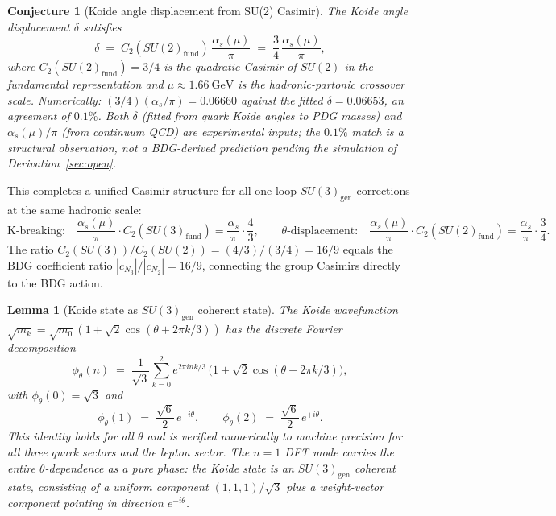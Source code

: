 \documentclass[11pt,a4paper]{article}
\newtheorem{lemma}[theorem]{Lemma}
\newtheorem{conjecture}[theorem]{Conjecture}
\begin{document}
\begin{conjecture}[Koide angle displacement from SU(2) Casimir]
\label{prop:delta_casimir}
The Koide angle displacement $\delta$ satisfies
\begin{equation}
  \delta \;=\; C_2\!\left(SU(2)_{\mathrm{fund}}\right)\,\frac{\alpha_s(\mu)}{\pi}
  \;=\; \frac{3}{4}\,\frac{\alpha_s(\mu)}{\pi},
  \label{eq:delta_casimir}
\end{equation}
where $C_2(SU(2)_{\mathrm{fund}}) = 3/4$ is the quadratic Casimir of $SU(2)$
in the fundamental representation and $\mu \approx 1.66~\mathrm{GeV}$
is the hadronic-partonic crossover scale.
Numerically: $(3/4)(\alpha_s/\pi) = 0.06660$ against the fitted
$\delta = 0.06653$, an agreement of $0.1\%$.
Both $\delta$ (fitted from quark Koide angles to PDG masses)
and $\alpha_s(\mu)/\pi$ (from continuum QCD) are experimental
inputs; the $0.1\%$ match is a structural observation, not a
BDG-derived prediction pending the simulation of Derivation~\ref{sec:open}.
\end{conjecture}

This completes a unified Casimir structure for all one-loop
$SU(3)_{\mathrm{gen}}$ corrections at the same hadronic scale:
\begin{equation}
  \text{K-breaking:}\quad
  \frac{\alpha_s(\mu)}{\pi}\cdot C_2\!\left(SU(3)_{\mathrm{fund}}\right)
  = \frac{\alpha_s}{\pi}\cdot\frac{4}{3},
  \qquad
  \text{$\theta$-displacement:}\quad
  \frac{\alpha_s(\mu)}{\pi}\cdot C_2\!\left(SU(2)_{\mathrm{fund}}\right)
  = \frac{\alpha_s}{\pi}\cdot\frac{3}{4}.
  \label{eq:casimir_pattern}
\end{equation}
The ratio $C_2(SU(3))/C_2(SU(2)) = (4/3)/(3/4) = 16/9$
equals the BDG coefficient ratio $|c_{N_3}|/|c_{N_2}| = 16/9$,
connecting the group Casimirs directly to the BDG action.

\begin{lemma}[Koide state as $SU(3)_{\mathrm{gen}}$ coherent state]
\label{lem:coherent}
The Koide wavefunction $\sqrt{m_k} = \sqrt{m_0}(1 + \sqrt{2}\cos(\theta
+ 2\pi k/3))$ has the discrete Fourier decomposition
\begin{equation}
  \phi_\theta(n) \;=\; \frac{1}{\sqrt{3}}\sum_{k=0}^2
  e^{2\pi ink/3}\,\bigl(1 + \sqrt{2}\cos(\theta+2\pi k/3)\bigr),
  \label{eq:koide_dft}
\end{equation}
with $\phi_\theta(0) = \sqrt{3}$ and
\begin{equation}
  \phi_\theta(1) \;=\; \frac{\sqrt{6}}{2}\,e^{-i\theta}, \qquad
  \phi_\theta(2) \;=\; \frac{\sqrt{6}}{2}\,e^{+i\theta}.
  \label{eq:koide_coherent}
\end{equation}
This identity holds for all $\theta$ and is verified numerically to
machine precision for all three quark sectors and the lepton sector.
The $n=1$ DFT mode carries the entire $\theta$-dependence as a pure
phase: the Koide state is an $SU(3)_{\mathrm{gen}}$ coherent state,
consisting of a uniform component $(1,1,1)/\sqrt{3}$ plus a
weight-vector component pointing in direction $e^{-i\theta}$.
\end{lemma}
\end{document}
